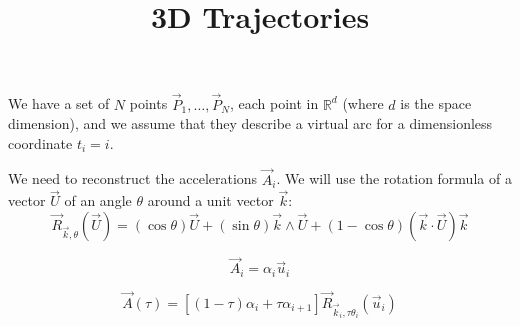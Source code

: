 \documentclass[aps,12pt]{revtex4}
\begin{document}
\title{3D Trajectories}
\maketitle
	
We have a set of $N$ points $\vec{P}_1,\ldots,\vec{P}_N$, each point in $\mathbb{R}^d$ (where $d$ is the space dimension), and we assume
that they describe a virtual arc for a dimensionless coordinate $t_i=i$.

We need to reconstruct the accelerations $\vec{A}_i$.
We will use the rotation formula of a vector $\vec{U}$ of an angle $\theta$ around a unit vector $\vec{k}$:
\begin{equation}
	\vec{R}_{\vec{k},\theta}(\vec{U})=	 \left(\cos \theta\right) \vec{U}
	+ \left(\sin \theta\right) \vec{k} \wedge\vec{U} 
	+ \left(1-\cos\theta\right) \left(\vec{k}\cdot\vec{U}\right)\vec{k}
\end{equation}

\begin{equation}
	\vec{A}_i = \alpha_i \vec{u}_i
\end{equation}

\begin{equation}
	\vec{A}(\tau) = \left[ (1-\tau)\alpha_i + \tau \alpha_{i+1}\right] \vec{R}_{\vec{k}_i,\tau \theta_i}(\vec{u}_i)
\end{equation}
\end{document}
